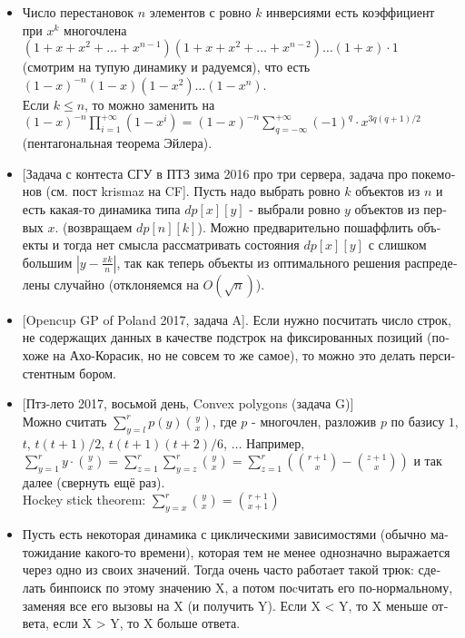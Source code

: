 \begin{itemize}
\item
\foreignlanguage{russian}{Число перестановок $n$ элементов
с ровно $k$ инверсиями есть коэффициент при $x^k$ многочлена \\
$(1 + x + x^2 + \ldots + x^{n - 1})(1 + x + x^2 + \ldots + x^{n - 2}) \ldots (1 + x) \cdot 1$ \\
(смотрим на
тупую динамику и радуемся), что есть \\
$(1 - x)^{-n} (1 - x) (1 - x^2) \ldots (1 - x^n)$. \\
Если
$k \leq n$, то можно заменить на \\
$(1 - x)^{-n} \prod\limits_{i = 1}^{+\infty} (1 - x^i) = (1 - x)^{-n} \sum\limits_{q = -\infty}^{+\infty} (-1)^q \cdot x^{3q(q + 1)/2}$ \\
(пентагональная
теорема Эйлера).}

\item
\foreignlanguage{russian}{[Задача с контеста СГУ в ПТЗ зима 2016 про три сервера, задача про покемонов
(см. пост krismaz на CF]. Пусть надо выбрать ровно $k$ объектов из $n$ и есть
какая-то динамика типа $dp[x][y]$ - выбрали ровно $y$ объектов из первых $x$.
(возвращаем $dp[n][k]$). Можно предварительно пошаффлить объекты и тогда
нет смысла рассматривать состояния $dp[x][y]$ с слишком большим
$|y - \frac{xk}{n}|$, так как теперь объекты из оптимального решения распределены
случайно (отклоняемся на $O(\sqrt{n})$).}

\item
\foreignlanguage{russian}{[Opencup GP of Poland 2017, задача A]. Если нужно посчитать число строк, не содержащих
данных в качестве подстрок на фиксированных позиций (похоже на Ахо-Корасик, но не
совсем то же самое), то можно это делать персистентным бором.}

\item
\foreignlanguage{russian}{[Птз-лето 2017, восьмой день, Convex polygons (задача G)]\\
Можно считать $\sum\limits_{y=l}^r p(y) {y \choose x}$, где $p$ - многочлен, разложив
$p$ по базису $1$, $t$, $t(t+1)/2$, $t(t+1)(t+2)/6$, $\ldots$ Например, \\
$\sum\limits_{y=1}^r y \cdot {y \choose x} = \sum\limits_{z=1}^r \sum\limits_{y=z}^r {y \choose x} =
\sum\limits_{z=1}^r ({r+1 \choose x} - {z+1 \choose x})$ и так далее (свернуть ещё раз).}\\
Hockey stick theorem: $\sum\limits_{y=x}^{r} {y \choose x} = {r+1 \choose x+1}$

\item
\foreignlanguage{russian}{Пусть есть некоторая динамика с циклическими зависимостями
(обычно матожидание какого-то времени), которая тем не менее однозначно
выражается через одно из своих значений. Тогда очень часто работает такой
трюк: сделать бинпоиск по этому значению X, а потом поcчитать его по-нормальному,
заменяя все его вызовы на X (и получить Y). Если X < Y, то X меньше ответа,
если X > Y, то X больше ответа.}

\end{itemize}

